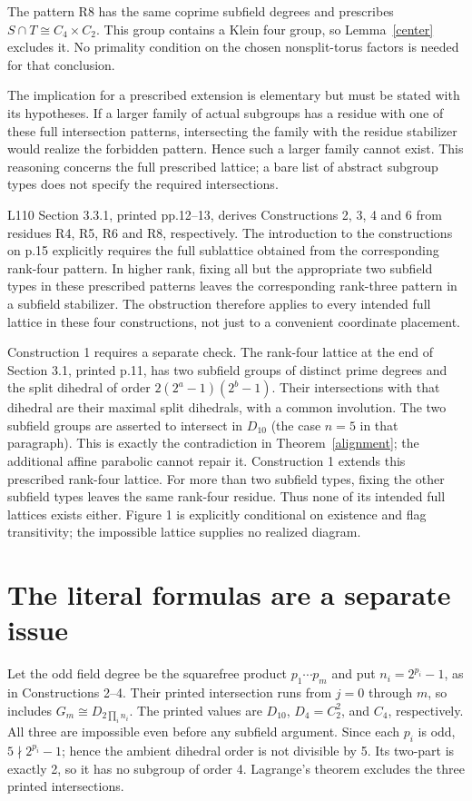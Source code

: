 \documentclass[11pt,a4paper]{article}
\begin{document}
The pattern R8 has the same coprime subfield degrees and prescribes
$S\cap T\cong C_4\times C_2$. This group contains a Klein four group,
so Lemma~\ref{center} excludes it. No primality condition on the
chosen nonsplit-torus factors is needed for that conclusion.

The implication for a prescribed extension is elementary but must be
stated with its hypotheses. If a larger family of actual subgroups has a
residue with one of these full intersection patterns, intersecting the
family with the residue stabilizer would realize the forbidden pattern.
Hence such a larger family cannot exist. This reasoning concerns the
full prescribed lattice; a bare list of abstract subgroup types does not
specify the required intersections.

L110 Section 3.3.1, printed pp.12--13, derives Constructions 2, 3, 4 and 6
from residues R4, R5, R6 and R8, respectively. The introduction to the
constructions on p.15 explicitly requires the full sublattice obtained
from the corresponding rank-four pattern. In higher rank, fixing all
but the appropriate two subfield types in these prescribed patterns
leaves the corresponding rank-three pattern in a subfield stabilizer.
The obstruction therefore applies to every intended full lattice in
these four constructions, not just to a convenient coordinate placement.

Construction 1 requires a separate check. The rank-four lattice at the
end of Section 3.1, printed p.11, has two subfield groups of distinct
prime degrees and the split dihedral of order
$2(2^a-1)(2^b-1)$. Their intersections with that dihedral are their
maximal split dihedrals, with a common involution. The two subfield
groups are asserted to intersect in $D_{10}$ (the case $n=5$ in that
paragraph). This is exactly the contradiction in
Theorem~\ref{alignment}; the additional affine parabolic cannot repair it.
Construction 1 extends this prescribed rank-four lattice. For more than
two subfield types, fixing the other subfield types leaves the same
rank-four residue. Thus none of its intended full lattices exists either.
Figure 1 is explicitly conditional on existence and flag transitivity;
the impossible lattice supplies no realized diagram.

\section{The literal formulas are a separate issue}
Let the odd field degree be the squarefree product $p_1\cdots p_m$
and put $n_i=2^{p_i}-1$, as in Constructions 2--4. Their printed
intersection runs from $j=0$ through $m$, so includes
$G_m\cong D_{2\prod_i n_i}$. The printed values are $D_{10}$,
$D_4=C_2^2$, and $C_4$, respectively. All three are impossible even
before any subfield argument. Since each $p_i$ is odd,
$5\nmid2^{p_i}-1$; hence the ambient dihedral order is not divisible
by 5. Its two-part is exactly 2, so it has no subgroup of order 4.
Lagrange's theorem excludes the three printed intersections.
\end{document}
